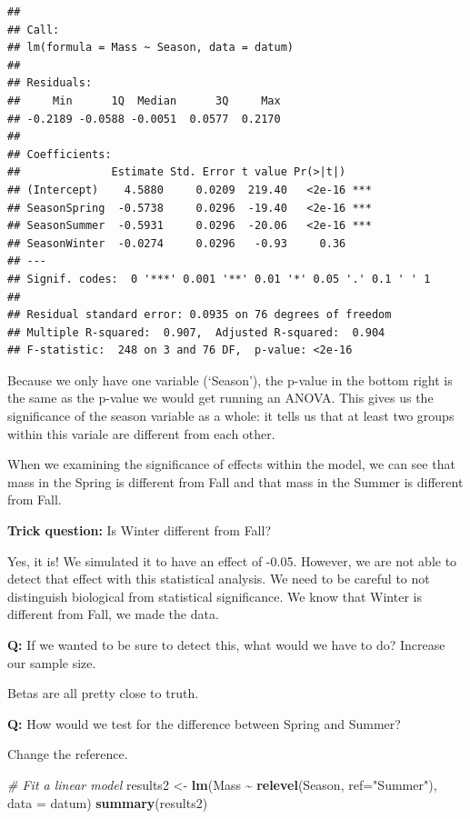 \documentclass[
]{article}
\newenvironment{Shaded}{\begin{snugshade}}{\end{snugshade}}
\newcommand{\AttributeTok}[1]{\textcolor[rgb]{0.13,0.29,0.53}{#1}}
\newcommand{\CommentTok}[1]{\textcolor[rgb]{0.56,0.35,0.01}{\textit{#1}}}
\newcommand{\FunctionTok}[1]{\textcolor[rgb]{0.13,0.29,0.53}{\textbf{#1}}}
\newcommand{\NormalTok}[1]{#1}
\newcommand{\OtherTok}[1]{\textcolor[rgb]{0.56,0.35,0.01}{#1}}
\newcommand{\SpecialCharTok}[1]{\textcolor[rgb]{0.81,0.36,0.00}{\textbf{#1}}}
\newcommand{\StringTok}[1]{\textcolor[rgb]{0.31,0.60,0.02}{#1}}
\begin{document}
\begin{verbatim}
## 
## Call:
## lm(formula = Mass ~ Season, data = datum)
## 
## Residuals:
##     Min      1Q  Median      3Q     Max 
## -0.2189 -0.0588 -0.0051  0.0577  0.2170 
## 
## Coefficients:
##              Estimate Std. Error t value Pr(>|t|)    
## (Intercept)    4.5880     0.0209  219.40   <2e-16 ***
## SeasonSpring  -0.5738     0.0296  -19.40   <2e-16 ***
## SeasonSummer  -0.5931     0.0296  -20.06   <2e-16 ***
## SeasonWinter  -0.0274     0.0296   -0.93     0.36    
## ---
## Signif. codes:  0 '***' 0.001 '**' 0.01 '*' 0.05 '.' 0.1 ' ' 1
## 
## Residual standard error: 0.0935 on 76 degrees of freedom
## Multiple R-squared:  0.907,  Adjusted R-squared:  0.904 
## F-statistic:  248 on 3 and 76 DF,  p-value: <2e-16
\end{verbatim}

Because we only have one variable (`Season'), the p-value in the bottom
right is the same as the p-value we would get running an ANOVA. This
gives us the significance of the season variable as a whole: it tells us
that at least two groups within this variale are different from each
other.

When we examining the significance of effects within the model, we can
see that mass in the Spring is different from Fall and that mass in the
Summer is different from Fall.

\textbf{Trick question:} Is Winter different from Fall?

Yes, it is! We simulated it to have an effect of -0.05. However, we are
not able to detect that effect with this statistical analysis. We need
to be careful to not distinguish biological from statistical
significance. We know that Winter is different from Fall, we made the
data.

\textbf{Q:} If we wanted to be sure to detect this, what would we have
to do? Increase our sample size.

Betas are all pretty close to truth.

\textbf{Q:} How would we test for the difference between Spring and
Summer?

Change the reference.

\begin{Shaded}
\begin{Highlighting}[]
\CommentTok{\# Fit a linear model}
\NormalTok{results2 }\OtherTok{\textless{}{-}} \FunctionTok{lm}\NormalTok{(Mass }\SpecialCharTok{\textasciitilde{}} \FunctionTok{relevel}\NormalTok{(Season, }\AttributeTok{ref=}\StringTok{"Summer"}\NormalTok{), }\AttributeTok{data =}\NormalTok{ datum)}
\FunctionTok{summary}\NormalTok{(results2)}
\end{Highlighting}
\end{Shaded}
\end{document}
